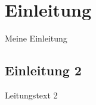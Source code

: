 \documentclass{article}
\begin{document}
\tableofcontents
\newpage

\section{Einleitung}

Meine Einleitung

\subsection{Einleitung 2}

Leitungstext 2
\end{document}
